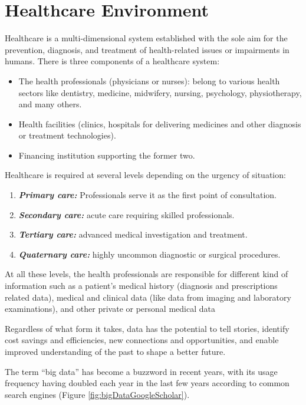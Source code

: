 \section{Healthcare Environment}
Healthcare is a multi-dimensional system established with the sole aim for the prevention, diagnosis, and treatment of health-related issues or impairments in humans. There is three components of a healthcare system\cite{dash2019big}:
\begin{itemize}
  \renewcommand{\labelitemi}{$\bullet$}
    \item The health professionals (physicians or nurses): belong to various health sectors like dentistry, medicine, midwifery, nursing, psychology, physiotherapy, and many others.
    \item Health facilities (clinics, hospitals for delivering medicines and other diagnosis or treatment technologies).
    \item Financing institution supporting the former two.
  \end{itemize}
  Healthcare is required at several levels depending on the urgency of situation:
  \begin{enumerate}
    \item \textbf{\textit{Primary care:}} Professionals serve it as the first point of consultation.
    \item \textbf{\textit{Secondary care:}} acute care requiring skilled professionals.
    \item \textbf{\textit{Tertiary care:}} advanced medical investigation and treatment.
    \item \textbf{\textit{Quaternary care:}} highly uncommon diagnostic or surgical procedures.
  \end{enumerate}
 At all these levels, the health professionals are responsible for different kind of information such as a patient's medical history (diagnosis and prescriptions related data), medical and clinical data (like data from imaging and laboratory examinations), and other private or personal medical data


Regardless of what form it takes, data has the potential to tell stories, identify cost savings and efficiencies, new connections and opportunities, and enable improved understanding of the past to shape a better future\cite{Zillner2016}.

The term “big data” has become a buzzword in recent years, with its usage frequency having doubled each year in the last few years according to common search engines (Figure \ref{fig:bigDataGoogleScholar}).

